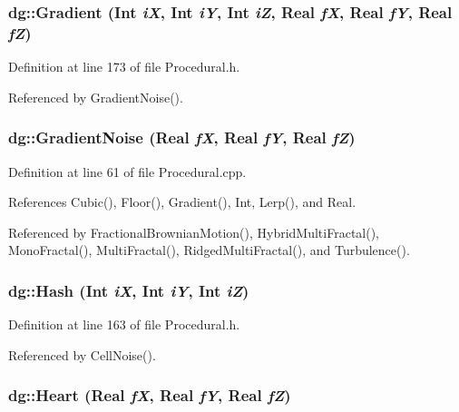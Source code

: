 \subsubsection{ dg::Gradient ({\bf Int} {\em i\-X}, {\bf Int} {\em i\-Y}, {\bf Int} {\em i\-Z}, {\bf Real} {\em f\-X}, {\bf Real} {\em f\-Y}, {\bf Real} {\em f\-Z})\hspace{0.3cm}{\tt  [inline]}}\label{namespacedg_a149}




Definition at line 173 of file Procedural.h.

Referenced by Gradient\-Noise().
\subsubsection{ dg::Gradient\-Noise ({\bf Real} {\em f\-X}, {\bf Real} {\em f\-Y}, {\bf Real} {\em f\-Z})}\label{namespacedg_a128}




Definition at line 61 of file Procedural.cpp.

References Cubic(), Floor(), Gradient(), Int, Lerp(), and Real.

Referenced by Fractional\-Brownian\-Motion(), Hybrid\-Multi\-Fractal(), Mono\-Fractal(), Multi\-Fractal(), Ridged\-Multi\-Fractal(), and Turbulence().
\subsubsection{ dg::Hash ({\bf Int} {\em i\-X}, {\bf Int} {\em i\-Y}, {\bf Int} {\em i\-Z})\hspace{0.3cm}{\tt  [inline]}}\label{namespacedg_a147}




Definition at line 163 of file Procedural.h.

Referenced by Cell\-Noise().
\subsubsection{ dg::Heart ({\bf Real} {\em f\-X}, {\bf Real} {\em f\-Y}, {\bf Real} {\em f\-Z})}\label{namespacedg_a74}




